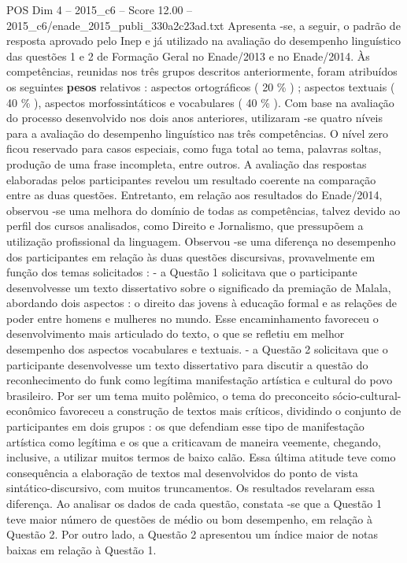 \begin{textsample}{POS Dim 4 – 2015\_c6 – Score 12.00 – 2015\_c6/enade\_2015\_publi\_330a2c23ad.txt}
Apresenta -se, a seguir, o padrão de resposta aprovado pelo Inep e já utilizado na avaliação do desempenho linguístico das questões 1 e 2 de Formação Geral no Enade/2013 e no Enade/2014.
Às competências, reunidas nos três grupos descritos anteriormente, foram atribuídos os seguintes \textbf{pesos} relativos : aspectos ortográficos ( 20 \% ) ; aspectos textuais ( 40 \% ), aspectos morfossintáticos e vocabulares ( 40 \% ).
Com base na avaliação do processo desenvolvido nos dois anos anteriores, utilizaram -se quatro níveis para a avaliação do desempenho linguístico nas três competências.
O nível zero ficou reservado para casos especiais, como fuga total ao tema, palavras soltas, produção de uma frase incompleta, entre outros.
A avaliação das respostas elaboradas pelos participantes revelou um resultado coerente na comparação entre as duas questões.
Entretanto, em relação aos resultados do Enade/2014, observou -se uma melhora do domínio de todas as competências, talvez devido ao perfil dos cursos analisados, como Direito e Jornalismo, que pressupõem a utilização profissional da linguagem.
Observou -se uma diferença no desempenho dos participantes em relação às duas questões discursivas, provavelmente em função dos temas solicitados : - a Questão 1 solicitava que o participante desenvolvesse um texto dissertativo sobre o significado da premiação de Malala, abordando dois aspectos : o direito das jovens à educação formal e as relações de poder entre homens e mulheres no mundo.
Esse encaminhamento favoreceu o desenvolvimento mais articulado do texto, o que se refletiu em melhor desempenho dos aspectos vocabulares e textuais. - a Questão 2 solicitava que o participante desenvolvesse um texto dissertativo para discutir a questão do reconhecimento do funk como legítima manifestação artística e cultural do povo brasileiro.
Por ser um tema muito polêmico, o tema do preconceito sócio-cultural-econômico favoreceu a construção de textos mais críticos, dividindo o conjunto de participantes em dois grupos : os que defendiam esse tipo de manifestação artística como legítima e os que a criticavam de maneira veemente, chegando, inclusive, a utilizar muitos termos de baixo calão.
Essa última atitude teve como consequência a elaboração de textos mal desenvolvidos do ponto de vista sintático-discursivo, com muitos truncamentos.
Os resultados revelaram essa diferença.
Ao analisar os dados de cada questão, constata -se que a Questão 1 teve maior número de questões de médio ou bom desempenho, em relação à Questão 2.
Por outro lado, a Questão 2 apresentou um índice maior de notas baixas em relação à Questão 1.

\end{textsample}
